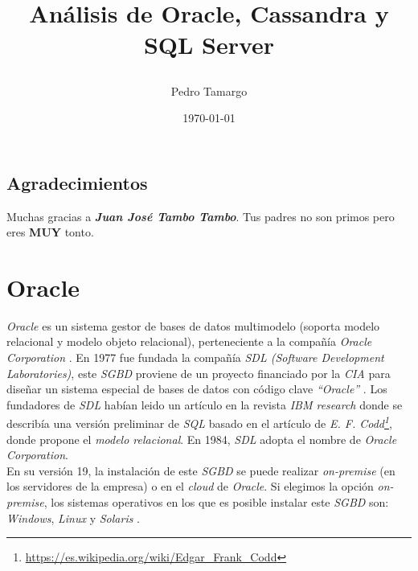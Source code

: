 \documentclass[11pt,a4paper]{article}
\begin{document}
\begin{titlepage}
\title{
\begin{Huge}
\textbf{Análisis de Oracle, Cassandra y SQL Server}
\end{Huge}
}
\author{Pedro Tamargo}
\date{\today}


\clearpage\maketitle
\thispagestyle{empty}
\tableofcontents

\section*{Agradecimientos}
Muchas gracias a \textbf{\textit{Juan José Tambo Tambo}}. Tus padres no son primos pero eres \textbf{{\Large MUY}} tonto.

\end{titlepage}

\newpage

\section{Oracle}

\emph{Oracle} es un sistema gestor de bases de datos multimodelo (soporta modelo relacional y modelo objeto relacional), perteneciente a la compañía \emph{Oracle Corporation} \cite{WIKI:1} . En 1977 fue fundada la compañía \emph{SDL (Software Development Laboratories)}, este \emph{SGBD} proviene de un proyecto financiado por la \emph{CIA} para diseñar un sistema especial de bases de datos con código clave \emph{``Oracle''} \cite{WIKI:2}. Los fundadores de \emph{SDL} habían leido un artículo en la revista \emph{IBM research} donde se describía una versión preliminar de \emph{SQL} basado en el artículo de \emph{E. F. Codd\footnote{\url{https://es.wikipedia.org/wiki/Edgar_Frank_Codd}}}, donde propone el \emph{modelo relacional}. En 1984, \emph{SDL} adopta el nombre de \emph{Oracle Corporation}.\\

En su versión 19, la instalación de este \emph{SGBD} se puede realizar \emph{on-premise} (en los servidores de la empresa) o en el \emph{cloud} de \emph{Oracle}. Si elegimos la opción \emph{on-premise}, los sistemas operativos en los que es posible instalar este \emph{SGBD} son: \emph{Windows}, \emph{Linux} y \emph{Solaris} \cite{ORA:1}.\\
\end{document}
